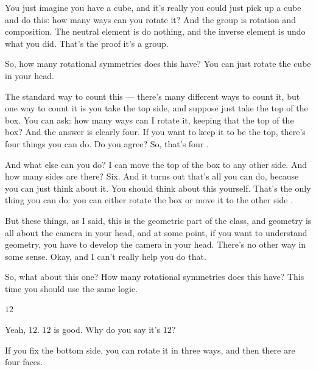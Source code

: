 \begin{speech}[00:34:15 - 00:35:37]
You just imagine you have a cube, and it's really you could just pick up a cube and do this: how many ways can you rotate it? And the group is rotation and composition. The neutral element is do nothing, and the inverse element is undo what you did. That's the proof it's a group.

So, how many rotational symmetries does this have? You can just rotate the cube in your head.

The standard way to count this --- there's many different ways to count it, but one way to count it is you take the top side, and suppose just take the top of the box. You can ask: how many ways can I rotate it, keeping that the top of the box? And the answer is clearly four. If you want to keep it to be the top, there's four things you can do. Do you agree? So, that's four .

And what else can you do? I can move the top of the box to any other side. And how many sides are there? Six. And it turns out that's all you can do, because you can just think about it. You should think about this yourself. That's the only thing you can do: you can either rotate the box or move it to the other side .

But these things, as I said, this is the geometric part of the class, and geometry is all about the camera in your head, and at some point, if you want to understand geometry, you have to develop the camera in your head. There's no other way in some sense. Okay, and I can't really help you do that.

So, what about this one? How many rotational symmetries does this have?  This time you should use the same logic.
\end{speech}

\begin{student}
$12$
\end{student}

\begin{speech}[00:35:38 - 00:35:49]
Yeah, $12$. $12$ is good. Why do you say it's $12$?
\end{speech}

\begin{student}
If you fix the bottom side, you can rotate it in three ways, and then there are four faces.
\end{student}


